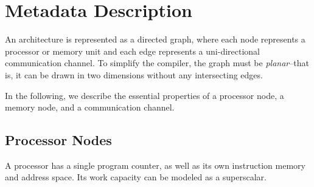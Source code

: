 \newcommand{\taba}[1]{\parbox{2.4in}{ ~ \vspace{-2pt} \\ #1 \vspace{-8pt} \\ }}
\newcommand{\tabb}[1]{\parbox{3.6in}{ ~ \vspace{-2pt} \\ #1 \vspace{-8pt} \\ }}
\newcommand{\mytable}[2]{
  {\small
    \begin{tabular}{|l|l|} \hline
      Attribute Name & #1 \\
      \hline \hline
      #2
    \end{tabular}
  }
}
\newcommand{\enttable}[1]{\mytable{Type - Units / Interpretation}{#1}}
\newcommand{\sumtable}[1]{\mytable{Summary}{#1}}
\newcommand{\justtable}[1]{\mytable{Summary and Justification}{#1}}
\newcommand{\entry}[3]{\taba{#1} & \tabb{#2 \\ #3} \\ \hline}
\newcommand{\summary}[2]{\taba{#1} & \tabb{#2} \\ \hline}
\newcommand{\just}[3]{\taba{#1} & \tabb{#2 \\ {\it #3}} \\ \hline}

\section{Metadata Description}

An architecture is represented as a directed graph, where each node
represents a processor or memory unit and each edge represents a
uni-directional communication channel.  To simplify the compiler, the
graph must be {\it planar}--that is, it can be drawn in two dimensions
without any intersecting edges.

In the following, we describe the essential properties of a processor
node, a memory node, and a communication channel.

\subsection{Processor Nodes}

A processor has a single program counter, as well as its own
instruction memory and address space.  Its work capacity can be
modeled as a superscalar.


